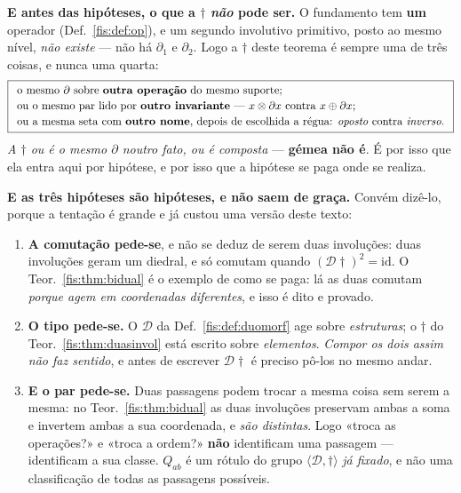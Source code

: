\documentclass[livro.tex]{subfiles}
\begin{document}
\medskip\noindent\textbf{E antes das hipóteses, o que a $\dagger$ \emph{não} pode
ser.} O fundamento tem \textbf{um} operador (Def.~\ref{fis:def:op}), e um
segundo involutivo primitivo, posto ao mesmo nível, \emph{não existe} --- não há
$\partial_1$ e $\partial_2$. Logo a $\dagger$ deste teorema é sempre uma de três
coisas, e nunca uma quarta:
\[
\boxed{
\begin{array}{l}
\text{o mesmo }\partial\ \text{sobre \textbf{outra operação} do mesmo suporte;}\\[2pt]
\text{ou o mesmo par lido por \textbf{outro invariante} ---}\ x\otimes\partial x\ \text{contra}\ x\oplus\partial x;\\[2pt]
\text{ou a mesma seta com \textbf{outro nome}, depois de escolhida a régua: \emph{oposto} contra \emph{inverso}.}
\end{array}}
\]
\emph{A $\dagger$ ou é o mesmo $\partial$ noutro fato, ou é composta} ---
\textbf{gémea não é}. É por isso que ela entra aqui por hipótese, e por isso que
a hipótese se paga onde se realiza.

\medskip\noindent\textbf{E as três hipóteses são hipóteses, e não saem de graça.}
Convém dizê-lo, porque a tentação é grande e já custou uma versão deste texto:
\begin{enumerate}\itemsep3pt
\item[(i)] \textbf{A comutação pede-se}, e não se deduz de serem duas involuções:
duas involuções geram um diedral, e só comutam quando $(\mathcal{D}\dagger)^{2}=\mathrm{id}$.
O Teor.~\ref{fis:thm:bidual} é o exemplo de como se paga: lá as duas comutam
\emph{porque agem em coordenadas diferentes}, e isso é dito e provado.
\item[(ii)] \textbf{O tipo pede-se.} O $\mathcal{D}$ da Def.~\ref{fis:def:duomorf}
age sobre \emph{estruturas}; o $\dagger$ do Teor.~\ref{fis:thm:duasinvol} está
escrito sobre \emph{elementos}. \emph{Compor os dois assim não faz sentido}, e
antes de escrever $\mathcal{D}\dagger$ é preciso pô-los no mesmo andar.
\item[(iii)] \textbf{E o par pede-se.} Duas passagens podem trocar a mesma coisa
sem serem a mesma: no Teor.~\ref{fis:thm:bidual} as duas involuções preservam
ambas a soma e invertem ambas a sua coordenada, e \emph{são distintas}. Logo
«troca as operações?» e «troca a ordem?» \textbf{não} identificam uma passagem ---
identificam a sua classe. $Q_{ab}$ é um rótulo do grupo $\langle\mathcal{D},\dagger\rangle$
\emph{já fixado}, e não uma classificação de todas as passagens possíveis.
\end{enumerate}
\end{document}
